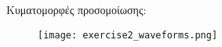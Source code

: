 Κυματομορφές προσομοίωσης:
\begin{figure}[H]
    \centering
    \texttt{[image: exercise2\_waveforms.png]}
\end{figure}